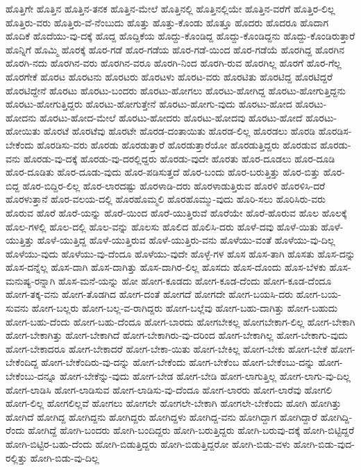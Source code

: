 {ಹೊತ್ತಿಗೇ
ಹೊತ್ತಿನ
ಹೊತ್ತಿನ-ತನಕ
ಹೊತ್ತಿನ-ಮೇಲೆ
ಹೊತ್ತಿನಲ್ಲಿ
ಹೊತ್ತಿನಲ್ಲಿಯೇ
ಹೊತ್ತಿನ-ವರೆಗೆ
ಹೊತ್ತಿರ-ಲಿಲ್ಲ
ಹೊತ್ತಿರು-ವರು
ಹೊತ್ತಿರು-ವೆ-ನೆಂಬುದು
ಹೊತ್ತು
ಹೊತ್ತು-ಕೊಂಡು
ಹೊತ್ತೂ
ಹೊದರು
ಹೊದರೂ
ಹೊದಾಗ
ಹೊದಿಕೆ
ಹೊದೆಯು-ವು-ದಕ್ಕೆ
ಹೊದ್ದ
ಹೊದ್ದಿಕೆಯ
ಹೊದ್ದು-ಕೊಂಡಿದ್ದ
ಹೊದ್ದು-ಕೊಂಡಿದ್ದನು
ಹೊದ್ದು-ಕೊಂಡಿರುತ್ತಾರೆ
ಹೊನ್ನಿಗೆ
ಹೊಮ್ಮಿ
ಹೊರಕ್ಕೆ
ಹೊರ-ಗಡೆ
ಹೊರ-ಗಡೆಯ
ಹೊರ-ಗಡೆ-ಯಿಂದ
ಹೊರ-ಗಡೆಯೆ
ಹೊರಗಿದ್ದ
ಹೊರಗಿನ
ಹೊರಗಿ-ನದು
ಹೊರಗಿನ-ವರು
ಹೊರಗಿನ-ವರೂ
ಹೊರಗಿ-ನಿಂದ
ಹೊರಗಿ-ರುವ
ಹೊರಗಿಲ್ಲ
ಹೊರಗೆ
ಹೊರ-ಗೆಲ್ಲ
ಹೊರಗೇಕೆ
ಹೊರಟ
ಹೊರಟನು
ಹೊರಟರು
ಹೊರಟಳು
ಹೊರಟ-ವರು
ಹೊರಟಿತು
ಹೊರಟಿದ್ದ
ಹೊರಟಿದ್ದರೆ
ಹೊರಟಿದ್ದೇನೆ
ಹೊರಟು
ಹೊರಟು-ಬಂದರು
ಹೊರಟು-ಹೋಗಲು
ಹೊರಟು-ಹೋಗಿದ್ದ
ಹೊರಟು-ಹೋಗುತ್ತಿದ್ದನು
ಹೊರಟು-ಹೋಗುತ್ತಿದ್ದರು
ಹೊರಟು-ಹೋಗುತ್ತೇನೆ
ಹೊರಟು-ಹೋಗು-ವುದು
ಹೊರಟು-ಹೋದ
ಹೊರಟು-ಹೋದನು
ಹೊರಟು-ಹೋದ-ಮೇಲೆ
ಹೊರಟು-ಹೋದರು
ಹೊರಟು-ಹೋದವು
ಹೊರಟು-ಹೋದೆ
ಹೊರಟು-ಹೋಯಿತು
ಹೊರಟೆ
ಹೊರಟೆವು
ಹೊರಟೇ
ಹೊರಡ-ದಂತಾಯಿತು
ಹೊರಡ-ಲಿಲ್ಲ
ಹೊರಡಲು
ಹೊರಡಿ
ಹೊರಡಿಸ-ಬೇಕೆಂದು
ಹೊರಡಿಸು-ವರು
ಹೊರಡು
ಹೊರಡುತ್ತಾರೆ
ಹೊರಡುತ್ತಾರೆಯೋ
ಹೊರಡುತ್ತಿದ್ದರು
ಹೊರಡುವ
ಹೊರಡು-ವನು
ಹೊರಡು-ವು-ದಕ್ಕೆ
ಹೊರಡು-ವು-ದರಲ್ಲಿದ್ದರು
ಹೊರಡು-ವುದೇ
ಹೊರತು
ಹೊರ-ದೂಡಲು
ಹೊರ-ದೂಡಿ
ಹೊರ-ದೂಡಿತು
ಹೊರ-ದೂಡು-ವುದು
ಹೊರ-ಪಡಿಸುತ್ತದೆ
ಹೊರ-ಬಂದು
ಹೊರ-ಬರುತ್ತಿತ್ತು
ಹೊರ-ಬಿತ್ತು
ಹೊರ-ಬಿದ್ದ
ಹೊರ-ಬಿದ್ದಿರ-ಲಿಲ್ಲ
ಹೊರ-ಲಾರದಷ್ಟು
ಹೊರಳಾಡಿ-ದರು
ಹೊರಳಾಡುತ್ತಿರುವ
ಹೊರಳಿ
ಹೊರಳಿಸಿ-ದರೆ
ಹೊರಳುತ್ತಾನೆ
ಹೊರ-ವಲಯ-ದಲ್ಲಿ
ಹೊರಹೊಮ್ಮಲಿ
ಹೊರಹೊಮ್ಮು-ವುದು
ಹೊರಿ-ಸಲು
ಹೊರಿಸಿರು-ವರು
ಹೊರುವ
ಹೊರೆ
ಹೊರೆ-ಯನ್ನು
ಹೊರೆ-ಯಿಂದ
ಹೊರೆ-ಯುತ್ತಿರುವೆ
ಹೊರೆಯೇ
ಹೊರೆ-ಹೊರುವ
ಹೊಲ
ಹೊಲಕ್ಕೆ
ಹೊಲ-ಗಳಲ್ಲಿ
ಹೊಲ-ದಲ್ಲಿ
ಹೊಲ-ವನ್ನು
ಹೊಲಸು
ಹೊಲಿದ
ಹೊಲಿಸಿ-ದರು
ಹೊಳೆ-ದವು
ಹೊಳೆ-ಯಿತು
ಹೊಳೆ-ಯುತ್ತಿತ್ತು
ಹೊಳೆ-ಯುತ್ತಿದ್ದ
ಹೊಳೆ-ಯುತ್ತಿರುವ
ಹೊಳೆ-ಯುತ್ತಿರು-ವನು
ಹೊಳೆಯು-ವಂತೆ
ಹೊಳೆಯು-ವು-ದಿಲ್ಲ
ಹೊಳೆಯು-ವುದು
ಹೊಳೆಯು-ವು-ದೆಂದೂ
ಹೊಳೆಯು-ವುದೇ
ಹೊಳ್ಳೆ-ಗಳ
ಹೊಸ
ಹೊಸ-ತಾಗಿ
ಹೊಸತು
ಹೊಸ-ದನ್ನು
ಹೊಸ-ದನ್ನೆಲ್ಲ
ಹೊಸ-ದಾಗಿ
ಹೊಸ-ದಾಗಿತ್ತು
ಹೊಸ-ದಾಗಿರ-ಲಿಲ್ಲ
ಹೊಸದು
ಹೊಸ-ದೊಂದು
ಹೊಸ-ಬೆಳಕು
ಹೊಸ-ಮನುಷ್ಯ-ರನ್ನಾಗಿ
ಹೊಸ-ಮನೆ-ಯನ್ನು
ಹೋ
ಹೋಗ-ಕೂಡದು
ಹೋಗ-ಕೂಡ-ದೆಂದು
ಹೋಗ-ಕೂಡ-ದೆಂದೂ
ಹೋಗ-ತಕ್ಕ-ವನು
ಹೋಗ-ತೊಡಗಿದ
ಹೋಗ-ದಂತೆ
ಹೋಗದೆ
ಹೋಗದೇ
ಹೋಗ-ಬಯಸಿ-ದರು
ಹೋಗ-ಬಯ-ಸುವನು
ಹೋಗ-ಬಲ್ಲರು
ಹೋಗ-ಬಲ್ಲ-ವ-ರಾಗಿದ್ದರು
ಹೋಗ-ಬಲ್ಲೆವು
ಹೋಗ-ಬಹು-ದಾಗಿತ್ತು
ಹೋಗ-ಬಹುದು
ಹೋಗ-ಬಹು-ದೆಂದು
ಹೋಗ-ಬಹು-ದೆಂದೂ
ಹೋಗ-ಬಾರದು
ಹೋಗಬೇಕಲ್ಲ
ಹೋಗಬೇಕಾಗ-ಲಿಲ್ಲ
ಹೋಗ-ಬೇಕಾಗಿ
ಹೋಗ-ಬೇಕಾಗಿತ್ತು
ಹೋಗ-ಬೇಕಾಗಿದೆ
ಹೋಗ-ಬೇಕಾಗಿರು-ವು-ದರಿಂದ
ಹೋಗ-ಬೇಕಾಗಿಲ್ಲ
ಹೋಗ-ಬೇಕಾಗು-ವುದು
ಹೋಗ-ಬೇಕಾದರೂ
ಹೋಗ-ಬೇಕಾದರೆ
ಹೋಗ-ಬೇಕಾ-ಯಿತು
ಹೋಗ-ಬೇಕಿಲ್ಲ
ಹೋಗ-ಬೇಕು
ಹೋಗ-ಬೇಕೆ
ಹೋಗ-ಬೇಕೆಂದಿದ್ದ
ಹೋಗ-ಬೇಕೆಂದಿರು-ವು-ದನ್ನು
ಹೋಗ-ಬೇಕೆಂದು
ಹೋಗ-ಬೇಕೆಂಬ
ಹೋಗ-ಬೇಕೆಂಬು-ದನ್ನು
ಹೋಗ-ಬೇಕೆಂಬು-ದನ್ನೂ
ಹೋಗ-ಬೇಕೆನ್ನು-ವುದು
ಹೋಗ-ಬೇಡ
ಹೋಗ-ಬೇಡಿ
ಹೋಗ-ಲಾಗುತ್ತಿಲ್ಲ
ಹೋಗ-ಲಾಗು-ವು-ದಿಲ್ಲ
ಹೋಗ-ಲಾಡಿಸಿ
ಹೋಗ-ಲಾಡಿಸುವ
ಹೋಗ-ಲಾಡಿಸು-ವು-ದೆಂದೂ
ಹೋಗ-ಲಾರರು
ಹೋಗ-ಲಾರೆವು
ಹೋಗಲಿ
ಹೋಗ-ಲಿಲ್ಲ
ಹೋಗಲಿಲ್ಲವೆ
ಹೋಗಲು
ಹೋಗಲೇ
ಹೋಗಲೇ-ಬೇಕಾಗಿ
ಹೋಗಲೇ-ಬೇಕೆಂದು
ಹೋಗಿ
ಹೋಗಿತ್ತು
ಹೋಗಿದೆ
ಹೋಗಿದ್ದ
ಹೋಗಿದ್ದನು
ಹೋಗಿದ್ದರು
ಹೋಗಿದ್ದಳು
ಹೋಗಿದ್ದ-ವನು
ಹೋಗಿದ್ದಾಗ
ಹೋಗಿದ್ದಾರೆ
ಹೋಗಿದ್ದಿ-ರೆಂದು
ಹೋಗಿದ್ದೆ
ಹೋಗಿ-ಬಂದರು
ಹೋಗಿ-ಬಂದಿದ್ದರು
ಹೋಗಿ-ಬರುತ್ತಿದ್ದರು
ಹೋಗಿ-ಬರುವು-ದಕ್ಕೆ
ಹೋಗಿ-ಬಿಟ್ಟಿದ್ದರೆ
ಹೋಗಿ-ಬಿಟ್ಟಿರ-ಬಹು-ದೆಂದು
ಹೋಗಿ-ಬಿಡುತ್ತಿದ್ದರು
ಹೋಗಿ-ಬಿಡುತ್ತಿದ್ದರೋ
ಹೋಗಿ-ಬಿಡು-ವಳು
ಹೋಗಿ-ಬಿಡು-ವುದ-ರಲ್ಲಿತ್ತು
ಹೋಗಿ-ಬಿಡು-ವು-ದಿಲ್ಲ
}
